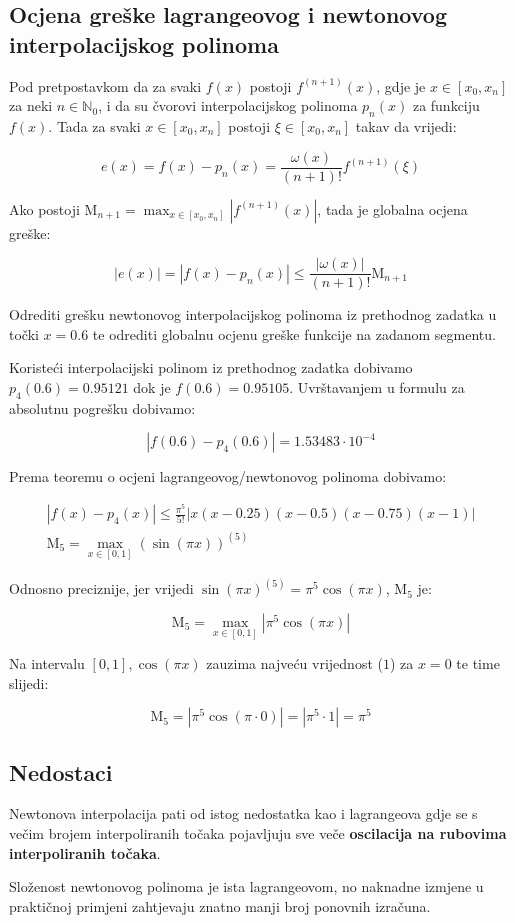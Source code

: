 \newpage

\subsection{Ocjena greške lagrangeovog i newtonovog interpolacijskog polinoma}

Pod pretpostavkom da za svaki $f(x)$ postoji $f^{(n+1)}(x)$, gdje je $x \in [x_0,x_n]$ za neki $n\in\mathbb{N}_0$, i da su čvorovi interpolacijskog polinoma $p_n(x)$ za funkciju $f(x)$. Tada za svaki $x\in[x_0,x_n]$ postoji $\xi\in[x_0,x_n]$ takav da vrijedi:

$$
e(x) = f(x) - p_n(x) = \frac{\omega(x)}{(n + 1)!}f^{(n+1)}(\xi)
$$

Ako postoji $\mathrm{M}_{n+1} = \max_{x\in[x_0,x_n]}\left|f^{(n+1)}(x)\right|$, tada je globalna ocjena greške:

$$
|e(x)| = |f(x) - p_n(x)| \leq \frac{|\omega(x)|}{(n+1)!}\mathrm{M}_{n+1}
$$

\begin{examplebox}
    Odrediti grešku newtonovog interpolacijskog polinoma iz prethodnog zadatka u točki $x=0.6$ te odrediti globalnu ocjenu greške funkcije na zadanom segmentu.
\end{examplebox}

Koristeći interpolacijski polinom iz prethodnog zadatka dobivamo $p_4(0.6) = 0.95121$ dok je $f(0.6) = 0.95105$. Uvrštavanjem u formulu za absolutnu pogrešku dobivamo:

$$
|f(0.6)-p_4(0.6)| = 1.53483\cdot10^{-4}
$$

Prema teoremu o ocjeni lagrangeovog/newtonovog polinoma dobivamo:

\begin{gather}
|f(x)-p_4(x)| \leq \frac{\pi^5}{5!}|x(x-0.25)(x-0.5)(x-0.75)(x-1)|\\
\mathrm{M}_5=\max_{x\in[0,1]}(\sin(\pi x))^{(5)}
\end{gather}

Odnosno preciznije, jer vrijedi $\sin(\pi x)^{(5)} = \pi^5\cos(\pi x)$, $\mathrm{M}_5$ je:

$$
\mathrm{M}_5 = \max_{x\in[0,1]}\left|\pi^5\cos(\pi x)\right|
$$

Na intervalu $[0,1], \cos(\pi x)$ zauzima najveću vrijednost ($1$) za $x=0$ te time slijedi:

$$
\mathrm{M}_5 = \left|\pi^5\cos(\pi \cdot 0)\right| = \left|\pi^5\cdot1\right| = \pi^5
$$

\subsection{Nedostaci}

Newtonova interpolacija pati od istog nedostatka kao i lagrangeova gdje se s večim brojem interpoliranih točaka pojavljuju sve veče \textbf{oscilacija na rubovima interpoliranih točaka}.

Složenost newtonovog polinoma je ista lagrangeovom, no naknadne izmjene u praktičnoj primjeni zahtjevaju znatno manji broj ponovnih izračuna.
